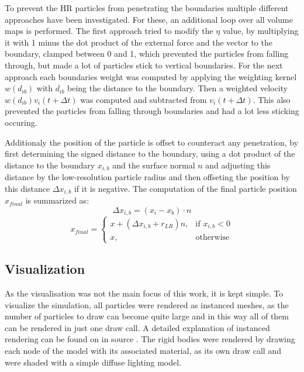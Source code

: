 \documentclass[intern]{cgMA}
\begin{document}
    To prevent the HR particles from penetrating the boundaries multiple different approaches have been investigated. For these, an additional loop over all volume maps is performed. The first approach tried to modify the $\eta$ value, by multiplying it with 1 minus the dot product of the external force and the vector to the boundary, clamped between 0 and 1, which prevented the particles from falling through, but made a lot of particles stick to vertical boundaries. For the next approach each boundaries weight was computed by applying the weighting kernel $w(d_{ib})$ with $d_{ib}$ being the distance to the boundary. Then a weighted velocity $w(d_{ib}) v_i(t + \Delta t)$ was computed and subtracted from $v_i(t + \Delta t)$. This also prevented the particles from falling through boundaries and had a lot less sticking occuring.

    Additionaly the position of the particle is offset to counteract any penetration, by first determining the signed distance to the boundary, using a dot product of the distance to the boundary $x_{i,b}$ and the surface normal $n$ and adjusting this distance by the low-resolution particle radius and then offseting the position by this distance $\Delta x_{i,b}$ if it is negative. The computation of the final particle position $x_{final}$ is summarized as:
    \begin{equation}
        \Delta x_{i,b} = (x_i - x_b) \cdot n
    \end{equation}
    \begin{equation}
        x_{final} = 
        \begin{cases}
            x + (\Delta x_{i,b} + r_{LR}) n,     & \text{if } x_{i,b} < 0 \\
            x,              & \text{otherwise}
        \end{cases}
    \end{equation}
    
    \subsection{Visualization}
    As the visualisation was not the main focus of this work, it is kept simple. To visualize the simulation, all particles were rendered as instanced meshes, as the number of particles to draw can become quite large and in this way all of them can be rendered in just one draw call. A detailed explanation of instanced rendering can be found on in source \cite{instancing}. The rigid bodies were rendered by drawing each node of the model with its associated material, as its own draw call and were shaded with a simple diffuse lighting model.
\end{document}
